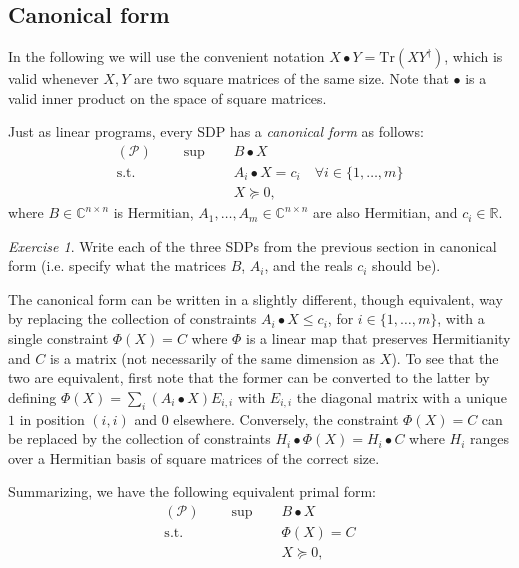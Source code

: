 \documentclass[11pt, letterpaper]{article}
\theoremstyle{remark}
\newtheorem{exercise}[theorem]{Exercise}
\theoremstyle{definition}
\numberwithin{equation}{section}
\newcommand{\1}{\mathbb{1}}
\newcommand{\C}{\ensuremath{\mathds{C}}}
\newcommand{\R}{\ensuremath{\mathds{R}}}
\newcommand{\Tr}{\mathrm{Tr}}
\begin{document}
\subsection{Canonical form}
 
In the following we will use the convenient notation $X\bullet Y = \Tr(XY^\dagger)$, which is valid whenever $X,Y$ are two square matrices of the same size. Note that $\bullet$ is a valid inner product on the space of square matrices. 

Just as linear programs, every SDP has a \emph{canonical form} as follows: 
\begin{align}
(\mathcal{P})\qquad\sup \quad & B\bullet X \label{eq:sdp-primal}\\
\text{s.t.}\quad & A_i\bullet X = c_i\quad\forall i\in\{1,\ldots,m\} \nonumber\\
& X\succeq 0, \nonumber
\end{align}
where $B\in \C^{n\times n}$ is Hermitian, $A_1,\ldots,A_m\in \C^{n\times n}$ are also Hermitian, and $c_i\in\R$.

\begin{exercise}
Write each of the three SDPs from the previous section in canonical form (i.e. specify what the matrices $B$, $A_i$, and the reals $c_i$ should be).
\end{exercise}

The canonical form can be written in a slightly different, though equivalent, way by replacing the collection of constraints $A_i\bullet X \leq c_i$, for $i\in\{1,\ldots,m\}$, with a single constraint $\Phi(X)=C$ where $\Phi$ is a linear map that preserves Hermitianity and $C$ is a matrix (not necessarily of the same dimension as $X$). To see that the two are equivalent, first note that the former can be converted to the latter by defining $\Phi(X) = \sum_i (A_i\bullet X) E_{i,i}$ with $E_{i,i}$ the diagonal matrix with a unique $1$ in position $(i,i)$ and $0$ elsewhere. Conversely, the constraint $\Phi(X)=C$ can be replaced by the collection of constraints $H_i\bullet\Phi(X)=H_i\bullet C$ where $H_i$ ranges over a Hermitian basis of square matrices of the correct size.  

Summarizing, we have the following equivalent primal form: 
\begin{align}
(\mathcal{P})\qquad\sup \quad & B\bullet X \label{eq:sdp-primal-2}\\
\text{s.t.}\quad & \Phi(X) = C \nonumber\\
& X\succeq 0, \nonumber
\end{align}
\end{document}

